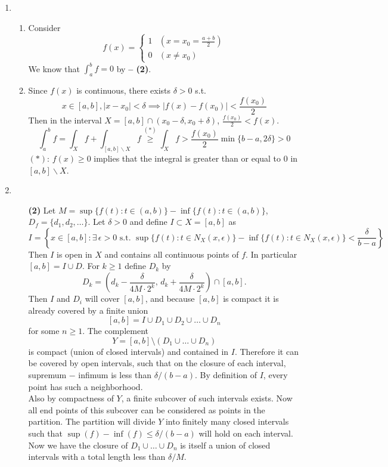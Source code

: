 \documentclass[11pt]{report}
\newcommand{\abs}[1]{\left|#1\right|}
\newcommand{\imp}{\implies}
\newcommand{\bs}{\backslash}
\begin{document}
\begin{enumerate}
\item
\begin{enumerate}
	\item Consider
	$$f(x) = \begin{cases}
		1 & (x = x_0 = \frac{a+b}{2}) \\ 0 & (x \neq x_0)
	\end{cases}$$
	We know that $\int_a^b f = 0$ by \textbf{ -- (2)}.
	\item Since $f(x)$ is continuous, there exists $\delta > 0$ s.t. $$x\in [a, b], \abs{x- x_0} <\delta \imp \abs{f(x)-f(x_0)} < \frac{f(x_0)}{2}$$
	Then in the interval $X = [a, b]\cap (x_0-\delta, x_0+ \delta)$, $\frac{f(x_0)}{2} < f(x)$.
	$$\int_a^b f = \int_X f + \int_{[a, b]\bs X} f \overset{(*)}{\geq}\int_X f > \frac{f(x_0)}{2} \min\{b-a, 2\delta\} > 0$$
	$(*)$: $f(x) \geq 0$ implies that the integral is greater than or equal to 0 in $[a, b]\bs X$.
\end{enumerate}
\item
\begin{enumerate}
	\item[\textbf{\sffamily (2)}]
	Let $M = \sup\{f(t): t\in (a, b)\} - \inf\{f(t): t\in (a, b)\}$, $D_f = \{d_1, d_2, \dots \}$.  Let $\delta > 0$ and define $I \subset X=[a,b]$ as $$I = \left\{ x \in [a,b] : \exists\,\epsilon > 0 \text{ s.t. }\sup\{f(t): t\in N_X(x, \epsilon)\} - \inf\{f(t): t\in N_X(x, \epsilon)\} < \frac{\delta}{b-a}  \right\}$$  Then $I$ is open in $X$ and contains all continuous points of $f$. In particular $[a,b] = I \cup D$. For $k \geq 1$ define $D_k$ by $$D_k = \left(d_k-\frac{\delta}{4M\cdot 2^{k}}, \, d_k+\frac{\delta}{4M\cdot 2^{k}} \right) \cap [a,b].$$  Then $I$ and $D_i$ will cover $[a,b]$, and because $[a,b]$ is compact it is already covered by a finite union $$[a,b] = I \cup D_1 \cup D_2 \cup \dots \cup D_n$$ for some $n \geq 1$.  The complement $$Y = [a,b] \setminus (D_1 \cup \dots \cup D_n)$$ is compact (union of closed intervals) and contained in $I$. Therefore it can be covered by open intervals, such that on the closure of each interval, supremum $-$ infimum is less than $\delta/(b-a)$. By definition of $I$, every point has such a neighborhood.\\
	Also by compactness of $Y$, a finite subcover of such intervals exists. Now all end points of this subcover can be considered as points in the partition. The partition will divide $Y$ into finitely many closed intervals such that $\sup(f) - \inf(f) \leq \delta/(b-a)$ will hold on each interval.  Now we have the closure of $D_1 \cup \dots \cup D_n$ is itself a union of closed intervals with a total length less than $\delta/M$.


\end{enumerate}
\end{enumerate}
\end{document}
